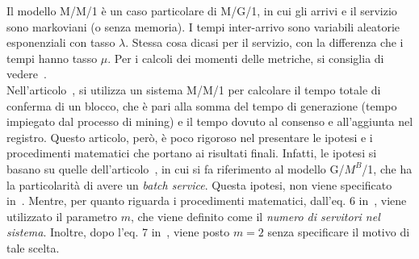 Il modello M/M/1 \`e un caso particolare di M/G/1, in cui gli arrivi e il servizio sono markoviani (o senza memoria). I tempi inter-arrivo sono variabili aleatorie esponenziali con tasso $\lambda$. Stessa cosa dicasi per il servizio, con la differenza che i tempi hanno tasso $\mu$.
Per i calcoli dei momenti delle metriche, si consiglia di vedere~\cite[546-552]{libro:tele}.\\
Nell'articolo~\cite{art:MM1}, si utilizza un sistema M/M/1 per calcolare il tempo totale di conferma di un blocco, che \`e pari alla somma del tempo di generazione (tempo impiegato dal processo di mining) e il tempo dovuto al consenso e all'aggiunta nel registro. 
Questo articolo, però, \`e poco rigoroso nel presentare le ipotesi e i procedimenti matematici che portano ai risultati finali. Infatti, le ipotesi si basano su quelle dell'articolo~\cite{art4:GM1}, in cui si fa riferimento al modello G/$M^B$/1, che ha la particolarità di avere un \textit{batch service}. Questa ipotesi, non viene specificato in~\cite{art:MM1}. Mentre, per quanto riguarda i procedimenti matematici, dall'eq. 6 in~\cite[sez. 3]{art:MM1}, viene utilizzato il parametro $m$, che viene definito come il \textit{numero di servitori nel sistema}. Inoltre, dopo l'eq. 7 in~\cite[sez. 3]{art:MM1}, viene posto $m=2$ senza specificare il motivo di tale scelta.


